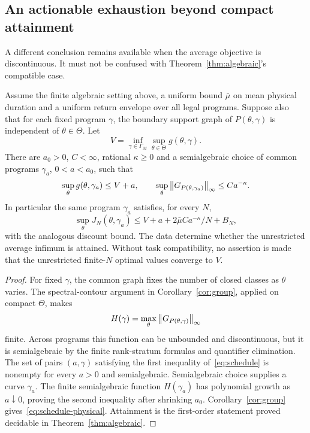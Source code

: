 \subsection{An actionable exhaustion beyond compact attainment}
A different conclusion remains available when the average objective is discontinuous. It must not be confused with Theorem~\ref{thm:algebraic}'s compatible case.

\begin{theorem}\label{thm:schedule}
Assume the finite algebraic setting above, a uniform bound $\bar\mu$ on mean physical duration and a uniform return envelope over all legal programs. Suppose also that for each fixed program $\gamma$, the boundary support graph of $P(\theta,\gamma)$ is independent of $\theta\in\Theta$. Let
\[
 V=\inf_{\gamma\in\Gamma_M}\sup_{\theta\in\Theta}g(\theta,\gamma).
\]
There are $a_0>0$, $C<\infty$, rational $\kappa\ge0$ and a semialgebraic choice of common programs $\gamma_a$, $0<a<a_0$, such that
\begin{equation}\label{eq:schedule}
 \sup_\theta g(\theta,\gamma_a)\le V+a,
 \qquad
 \sup_\theta\left\lVert G_{P(\theta,\gamma_a)}\right\rVert_\infty\le Ca^{-\kappa}.
\end{equation}
In particular the same program $\gamma_a$ satisfies, for every $N$,
\begin{equation}\label{eq:schedule-physical}
 \sup_\theta J_N(\theta,\gamma_a)
 \le V+a+2\bar\mu Ca^{-\kappa}/N+B_N,
\end{equation}
with the analogous discount bound. The data determine whether the unrestricted average infimum is attained. Without task compatibility, no assertion is made that the unrestricted finite-$N$ optimal values converge to $V$.
\end{theorem}
\begin{proof}
For fixed $\gamma$, the common graph fixes the number of closed classes as $\theta$ varies. The spectral-contour argument in Corollary~\ref{cor:group}, applied on compact $\Theta$, makes
\[
 H(\gamma)=\max_\theta\left\lVert G_{P(\theta,\gamma)}\right\rVert_\infty
\]
finite. Across programs this function can be unbounded and discontinuous, but it is semialgebraic by the finite rank-stratum formulas and quantifier elimination. The set of pairs $(a,\gamma)$ satisfying the first inequality of~\eqref{eq:schedule} is nonempty for every $a>0$ and semialgebraic. Semialgebraic choice supplies a curve $\gamma_a$. The finite semialgebraic function $H(\gamma_a)$ has polynomial growth as $a\downarrow0$, proving the second inequality after shrinking $a_0$. Corollary~\ref{cor:group} gives~\eqref{eq:schedule-physical}. Attainment is the first-order statement proved decidable in Theorem~\ref{thm:algebraic}.
\end{proof}
